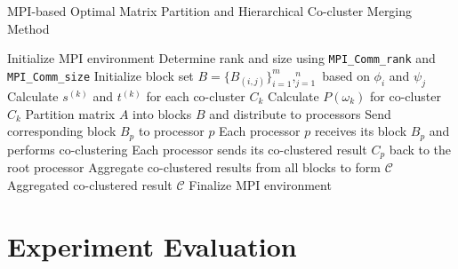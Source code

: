 \documentclass[journal]{IEEEtran}
\begin{document}
\begin{algorithm}[!t]
  \caption{MPI-based Optimal Matrix Partition and Hierarchical Co-cluster Merging Method}\label{alg:mpi_method}
  \begin{algorithmic}[1]
    \STATE Initialize MPI environment
    \STATE Determine rank and size using \texttt{MPI\_Comm\_rank} and \texttt{MPI\_Comm\_size}
      \STATE Initialize block set $B = \{B_{(i,j)}\}_{i=1}^m,_{j=1}^n$ based on $\phi_i$ and $\psi_j$
      \STATE Calculate $s^{(k)}$ and $t^{(k)}$ for each co-cluster $C_k$
        \STATE Calculate $P(\omega_k)$ for co-cluster $C_k$
          \STATE Partition matrix $A$ into blocks $B$ and distribute to processors
            \STATE Send corresponding block $B_p$ to processor $p$
          \ENDFOR
        \ENDIF
      \ENDFOR
    \ENDIF
    \STATE Each processor $p$ receives its block $B_p$ and performs co-clustering
    \STATE Each processor sends its co-clustered result $C_p$ back to the root processor
      \STATE Aggregate co-clustered results from all blocks to form $\mathcal{C}$
      \RETURN Aggregated co-clustered result $\mathcal{C}$
    \ENDIF
    \STATE Finalize MPI environment
  \end{algorithmic}
\end{algorithm}


\section{Experiment Evaluation}
\label{sec:experiment}
\end{document}
